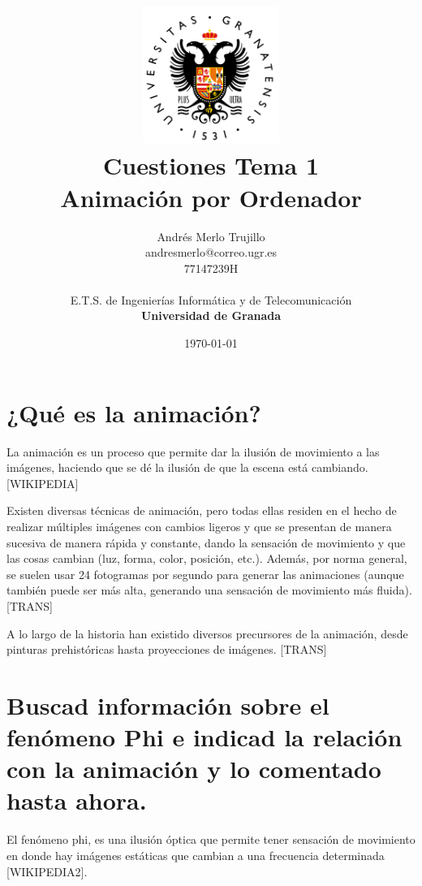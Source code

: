 \documentclass{article}
\title{
\includegraphics[width=1.75in]{imagenes/UGR-Logo.png} \\
\vspace*{1in}
\textbf{Cuestiones Tema 1} \\
Animación por Ordenador \\
\vspace*{0.5in}}
\author{Andrés Merlo Trujillo \\
andresmerlo@correo.ugr.es \\
77147239H \\ 
\vspace*{0.5in} \\
E.T.S. de Ingenierías Informática y de Telecomunicación \\
\textbf{Universidad de Granada}} \date{\today}
\begin{document}
\begin{titlingpage}
\maketitle
\end{titlingpage}

\tableofcontents

\newpage

\pagestyle{fancy}   %

\section{¿Qué es la animación?}

La animación es un proceso que permite dar la ilusión de movimiento a las imágenes, haciendo que se dé la ilusión de que la escena está cambiando. [WIKIPEDIA] 

\bigskip

Existen diversas técnicas de animación, pero todas ellas residen en el hecho de realizar múltiples imágenes con cambios ligeros y que se presentan de manera sucesiva de manera rápida y constante, dando la sensación de movimiento y que las cosas cambian (luz, forma, color, posición, etc.). Además, por norma general, se suelen usar 24 fotogramas por segundo para generar las animaciones (aunque también puede ser más alta, generando una sensación de movimiento más fluida). [TRANS]

\bigskip

A lo largo de la historia han existido diversos precursores de la animación, desde pinturas prehistóricas hasta proyecciones de imágenes. [TRANS]

\section{Buscad información sobre el fenómeno Phi e indicad la relación con la animación y lo comentado hasta ahora.}

El fenómeno phi, es una ilusión óptica que permite tener sensación de movimiento en donde hay imágenes estáticas que cambian a una frecuencia determinada [WIKIPEDIA2]. 
\end{document}
